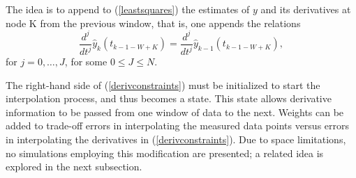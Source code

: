 The idea is to append to (\ref{leastsquares}) the estimates of $y$ and
its derivatives at node K from the previous window, that is, one appends
the relations
\begin{equation}
\frac{d^j}{dt^j} \hat{y}_k(t_{k-1-W+K}) =  \frac{d^j}{dt^j} \hat{y}_{k-1}(t_{k-1-W+K}),
\label{derivconstraints}
\end{equation}
for $j=0, \ldots, J$, for some $0 \le J \le N$.

The right-hand side of (\ref{derivconstraints}) must be initialized to
start the interpolation process, and thus becomes a state.  This state 
allows derivative 
information to be passed from one window of data 
to the next.   
Weights can be added to trade-off errors in interpolating the measured data points
versus errors in interpolating the derivatives in (\ref{derivconstraints}). 
Due to space limitations, no simulations employing this
modification are presented; a related idea is explored in the next subsection.

